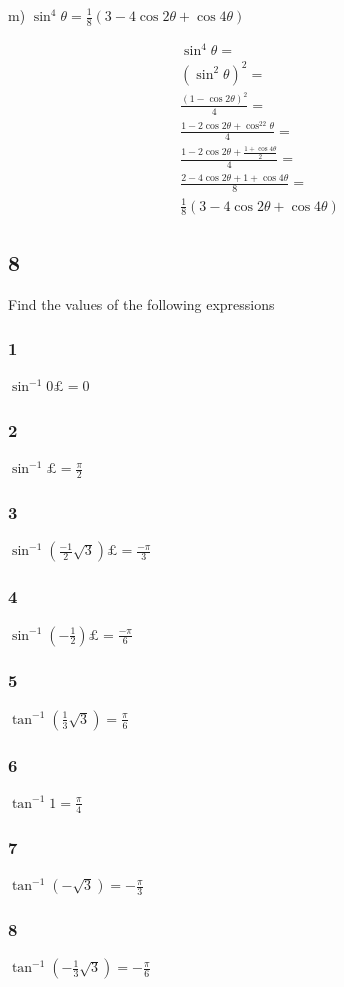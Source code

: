 \documentclass[]{report}
\begin{document}
m) $\sin^4\theta =\frac{1}{8}(3 - 4\cos2\theta + \cos4\theta)$

\begin{align*}
\sin^4\theta = \\
(\sin^2\theta)^2 = \\
\frac{(1 - \cos2\theta)^2}{4} = \\
\frac{1 - 2\cos2\theta + \cos^22\theta}{4} = \\
\frac{1 - 2\cos2\theta + \frac{1 + \cos4\theta}{2}}{4} = \\
\frac{2 - 4\cos2\theta + 1 + \cos4\theta}{8} = \\
\frac{1}{8}(3 - 4\cos2\theta + \cos4\theta)
\end{align*}


\subsection{8}
Find the values of the following expressions

\subsubsection{1}
$\sin^{-1}0£ = 0$
\subsubsection{2}
$\sin^{-1}£ = \frac{\pi}{2}$
\subsubsection{3}
$\sin^{-1}(\frac{-1}{2}\sqrt{3})£ = \frac{-\pi}{3}$
\subsubsection{4}
$\sin^{-1}(-\frac{1}{2})£ = \frac{-\pi}{6}$
\subsubsection{5}
$\tan^{-1}(\frac{1}{3}\sqrt{3}) =\frac{\pi}{6} $
\subsubsection{6}
$\tan^{-1}1 = \frac{\pi}{4}$
\subsubsection{7}
$\tan^{-1}(-\sqrt{3}) = -\frac{\pi}{3}$
\subsubsection{8}
$\tan^{-1}(-\frac{1}{3}\sqrt{3}) = -\frac{\pi}{6}$
\end{document}
